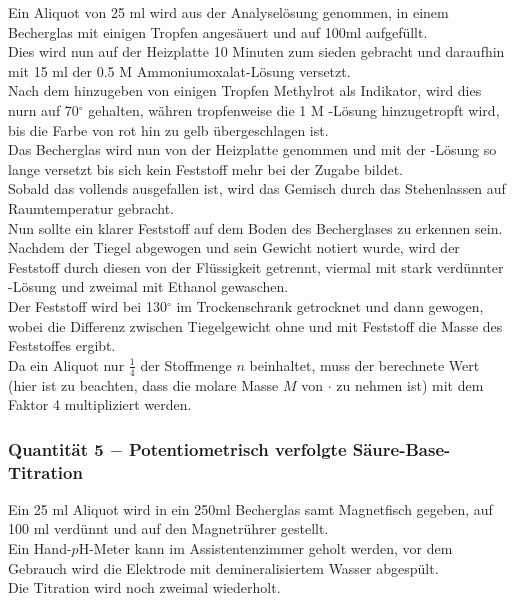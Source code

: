 \documentclass{article}
\begin{document}
Ein Aliquot von 25 ml wird aus der Analyselösung genommen, in einem Becherglas mit einigen Tropfen  angesäuert und auf 100ml aufgefüllt.\\
Dies wird nun auf der Heizplatte 10 Minuten zum sieden gebracht und daraufhin mit 15 ml der 0.5 M Ammoniumoxalat\textcolor{gray}{}-Lösung versetzt.\\
Nach dem hinzugeben von einigen Tropfen Methylrot als Indikator, wird dies nurn auf 70$^\circ$ gehalten, währen tropfenweise die 1 M -Lösung hinzugetropft wird, bis die Farbe von rot hin zu gelb übergeschlagen ist.\\
Das Becherglas wird nun von der Heizplatte genommen und mit der -Lösung so lange versetzt bis sich kein Feststoff mehr bei der Zugabe bildet.\\
Sobald das  vollends ausgefallen ist, wird das Gemisch durch das Stehenlassen auf Raumtemperatur gebracht.\\
Nun sollte ein klarer Feststoff auf dem Boden des Becherglases zu erkennen sein.\\
Nachdem der Tiegel abgewogen und sein Gewicht notiert wurde, wird der Feststoff durch diesen von der Flüssigkeit getrennt, viermal mit stark verdünnter -Lösung und zweimal mit Ethanol gewaschen.\\
Der Feststoff wird bei 130$^\circ$ im Trockenschrank getrocknet und dann gewogen, wobei die Differenz zwischen Tiegelgewicht ohne und mit Feststoff die Masse des Feststoffes ergibt.\\
Da ein Aliquot nur $\frac{1}{4}$ der Stoffmenge $n$ beinhaltet, muss der berechnete Wert (hier ist zu beachten, dass die molare Masse $M$ von $\cdot$ zu nehmen ist) mit dem Faktor 4 multipliziert werden.

\subsubsection{Quantität 5 $-$ Potentiometrisch verfolgte Säure-Base-Titration}

Ein 25 ml Aliquot wird in ein 250ml Becherglas samt Magnetfisch gegeben, auf 100 ml verdünnt und auf den Magnetrührer gestellt.\\
Ein Hand-$p$H-Meter kann im Assistentenzimmer geholt werden, vor dem Gebrauch wird die Elektrode mit demineralisiertem Wasser abgespült.\\
Die Titration wird noch zweimal wiederholt.\\

\end{document}
